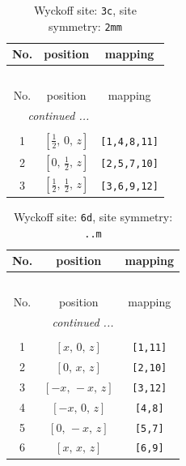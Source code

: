 \documentclass[fleqn,8pt]{jsarticle}
\begin{document}
\begin{longtable}{ccc}
\caption{Wyckoff site: {\tt 3c}, site symmetry: {\tt 2mm}}
 \\
 \hline \hline
No. & position & mapping \\ \hline \endfirsthead

\multicolumn{2}{l}{\tablename\ \thetable{}} \\
 \hline \hline
No. & position & mapping \\ \hline \endhead

 \hline \hline
\multicolumn{2}{r}{\footnotesize\it continued ...} \\ \endfoot

 \hline \hline
\multicolumn{2}{r}{} \\ \endlastfoot

1 & $\left[ \frac{1}{2},\, 0,\, z \right]$ & {\tt [1,4,8,11]} \\ \hline
2 & $\left[ 0,\, \frac{1}{2},\, z \right]$ & {\tt [2,5,7,10]} \\ \hline
3 & $\left[ \frac{1}{2},\, \frac{1}{2},\, z \right]$ & {\tt [3,6,9,12]} \\
\end{longtable}
\renewcommand{\arraystretch}{1.2}
\begin{longtable}{ccc}
\caption{Wyckoff site: {\tt 6d}, site symmetry: {\tt ..m}}
 \\
 \hline \hline
No. & position & mapping \\ \hline \endfirsthead

\multicolumn{2}{l}{\tablename\ \thetable{}} \\
 \hline \hline
No. & position & mapping \\ \hline \endhead

 \hline \hline
\multicolumn{2}{r}{\footnotesize\it continued ...} \\ \endfoot

 \hline \hline
\multicolumn{2}{r}{} \\ \endlastfoot

1 & $\left[ x,\, 0,\, z \right]$ & {\tt [1,11]} \\ \hline
2 & $\left[ 0,\, x,\, z \right]$ & {\tt [2,10]} \\ \hline
3 & $\left[ - x,\, - x,\, z \right]$ & {\tt [3,12]} \\ \hline
4 & $\left[ - x,\, 0,\, z \right]$ & {\tt [4,8]} \\ \hline
5 & $\left[ 0,\, - x,\, z \right]$ & {\tt [5,7]} \\ \hline
6 & $\left[ x,\, x,\, z \right]$ & {\tt [6,9]} \\
\end{longtable}
\end{document}
